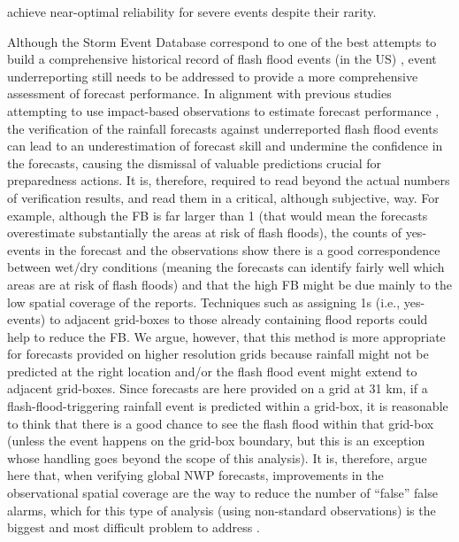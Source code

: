achieve near-optimal reliability for severe events despite their rarity. 








Although  the Storm Event Database correspond to one of the best attempts to build a comprehensive historical record of flash flood events (in the US) , event underreporting still needs to be addressed to provide a more comprehensive assessment of forecast performance. In alignment with previous studies attempting to use impact-based observations to estimate forecast performance \citep{Hitchens_2013, Robbins_2018, Mitheu_2023, Mitheu_2025}, the verification of the rainfall forecasts against underreported flash flood events can lead to an underestimation of forecast skill and undermine the confidence in the forecasts, causing the dismissal of valuable predictions crucial for preparedness actions. It is, therefore, required to read beyond the actual numbers of verification results, and read them in a critical, although subjective, way. For example, although the FB is far larger than 1 (that would mean the forecasts overestimate substantially the areas at risk of flash floods), the counts of yes-events in the forecast and the observations show there is a good correspondence between wet/dry conditions (meaning the forecasts can identify fairly well which areas are at risk of flash floods) and that the high FB might be due mainly to the low spatial coverage of the reports. Techniques such as assigning 1s (i.e., yes-events) to adjacent grid-boxes to those already containing flood reports could help to reduce the FB. We argue, however, that this method is more appropriate for forecasts provided on higher resolution grids because rainfall might not be predicted at the right location and/or the flash flood event might extend to adjacent grid-boxes. Since forecasts are here provided on a grid at 31 km, if a flash-flood-triggering rainfall event is predicted within a grid-box, it is reasonable to think that there is a good chance to see the flash flood within that grid-box (unless the event happens on the grid-box boundary, but this is an exception whose handling goes beyond the scope of this analysis). It is, therefore, argue here that, when verifying global NWP forecasts, improvements in the observational spatial coverage are the way to reduce the number of “false” false alarms, which for this type of analysis (using non-standard observations) is the biggest and most difficult problem to address \citep{Marsigli_2021}.

